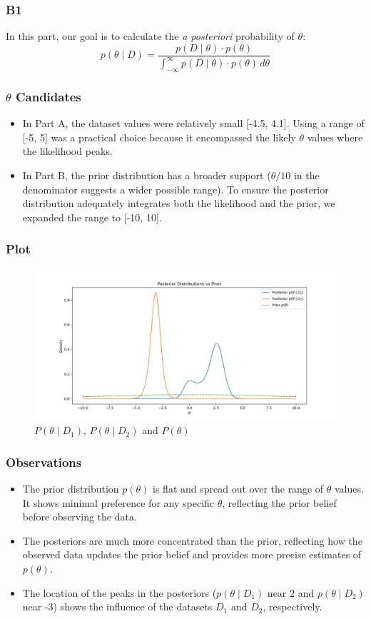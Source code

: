 \documentclass{beamer}
\begin{document}
\begin{frame}
\frametitle{B1}
In this part, our goal is to calculate the \textit{a posteriori} probability of $\theta$:
$$
p(\theta \mid D) = \frac{p(D \mid \theta) \cdot p(\theta)}{\int_{-\infty}^{\infty} p(D \mid \theta) \cdot p(\theta) \, d\theta}
$$
\end{frame}

\begin{frame}
\frametitle{$\theta$ Candidates}
\begin{itemize}
    \item In Part A, the dataset values were relatively small [-4.5, 4.1]. Using a range of [-5, 5] was a practical choice because it encompassed the likely $\theta$ values where the likelihood peaks.
    \item In Part B, the prior distribution has a broader support ($\theta / 10$ in the denominator suggests a wider possible range). To ensure the posterior distribution adequately integrates both the likelihood and the prior, we expanded the range to [-10, 10].
\end{itemize}

\end{frame}

\begin{frame}
\frametitle{Plot}
\begin{figure}
    \centering
    \includegraphics[width=1\linewidth]{assets/B1.png}
    \caption{$P(\theta \mid D_1)$, $P(\theta \mid D_2)$ and $P(\theta)$}
    \label{fig:enter-label}
\end{figure}
\end{frame}

\begin{frame}
\frametitle{Observations}
\begin{itemize}
    \item The prior distribution $p(\theta)$ is flat and spread out over the range of $\theta$ values. It shows minimal preference for any specific $\theta$, reflecting the prior belief before observing the data.
    \item The posteriors are much more concentrated than the prior, reflecting how the observed data updates the prior belief and provides more precise estimates of $p(\theta)$.
    \item The location of the peaks in the posteriors ($p(\theta \mid D_1)$ near 2 and $p(\theta \mid D_2)$ near -3) shows the influence of the datasets $D_1$ and $D_2$, respectively.
\end{itemize}
\end{frame}
\end{document}
